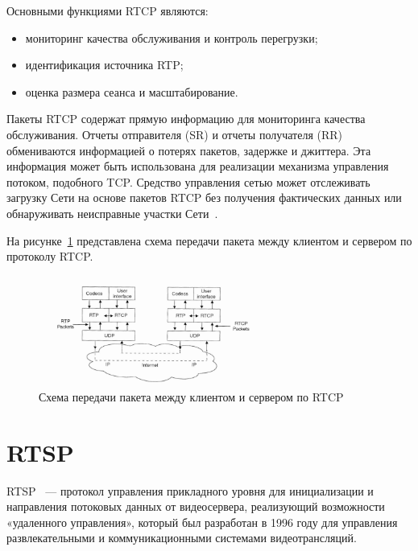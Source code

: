 Основными функциями RTCP являются:
\begin{itemize}
	\item мониторинг качества обслуживания и контроль перегрузки;
	\item идентификация источника RTP;
	\item оценка размера сеанса и масштабирование.
\end{itemize}
Пакеты RTCP содержат прямую информацию для мониторинга качества обслуживания. 
Отчеты отправителя (SR) и отчеты получателя (RR) обмениваются информацией о потерях пакетов, задержке и джиттера. 
Эта информация может быть использована для реализации механизма управления потоком, подобного TCP.
Средство управления сетью может отслеживать загрузку Сети на основе пакетов RTCP без получения фактических данных или обнаруживать неисправные участки Сети~\cite{rtp_rtcp_overview, rtp_rtcp_rtsp_mc}.
 
На рисунке~\ref{pr:rtcp_udp} представлена схема передачи пакета между клиентом и сервером по протоколу RTCP.

\begin{figure}[h]
	\centering
	\includegraphics[width=0.67\textwidth]{img/rtcp_over_udp.png}
	\caption{Схема передачи пакета между клиентом и сервером по RTCP~\cite{rtp_rtcp_rtsp_mc}}
	\label{pr:rtcp_udp}
\end{figure}

\section{RTSP}

RTSP~\cite{rfc_rtsp} --- протокол управления прикладного уровня для инициализации и направления потоковых данных от видеосервера, реализующий возможности «удаленного управления», который был разработан в 1996 году для управления развлекательными и коммуникационными системами видеотрансляций.

